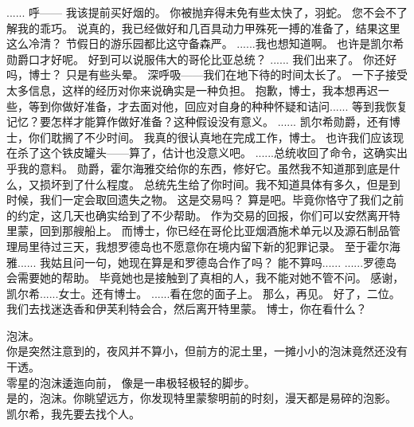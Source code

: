 \documentclass[openany]{book}
\begin{document}
\begin{dialogue}
     ......
     呼——
     我该提前买好烟的。
     你被抛弃得未免有些太快了，羽蛇。
     您不会不了解我的乖巧。
     说真的，我已经做好和几百具动力甲殊死一搏的准备了，结果这里这么冷清？
     节假日的游乐园都比这守备森严。
     ......我也想知道啊。
     也许是凯尔希勋爵口才好呢。
     好到可以说服伟大的哥伦比亚总统？
     ......
     我们出来了。
     你还好吗，博士？
     只是有些头晕。
     深呼吸——我们在地下待的时间太长了。
     一下子接受太多信息，这样的经历对你来说确实是一种负担。
     抱歉，博士，我本想再迟一些，等到你做好准备，才去面对他，回应对自身的种种怀疑和诘问......
     等到我恢复记忆？要怎样才能算作做好准备？这种假设没有意义。
     ......
     凯尔希勋爵，还有博士，你们耽搁了不少时间。
     我真的很认真地在完成工作，博士。
     也许我们应该现在杀了这个铁皮罐头——算了，估计也没意义吧。
     ......总统收回了命令，这确实出乎我的意料。
     勋爵，霍尔海雅交给你的东西，修好它。虽然我不知道那到底是什么，又损坏到了什么程度。
     总统先生给了你时间。我不知道具体有多久，但是到时候，我们一定会取回遗失之物。
     这是交易吗？
     算是吧。毕竟你恪守了我们之前的约定，这几天也确实给到了不少帮助。
     作为交易的回报，你们可以安然离开特里蒙，回到那艘船上。
     而博士，你已经在哥伦比亚烟酒施术单元以及源石制品管理局里待过三天，我想罗德岛也不愿意你在境内留下新的犯罪记录。
     至于霍尔海雅......
     我姑且问一句，她现在算是和罗德岛合作了吗？
     能不算吗......
     ......罗德岛会需要她的帮助。
     毕竟她也是接触到了真相的人，我不能对她不管不问。
     感谢，凯尔希......女士。还有博士。
     ......看在您的面子上。
     那么，再见。
     好了，二位。
     我们去找迷迭香和伊芙利特会合，然后离开特里蒙。
     博士，你在看什么？\par
    泡沫。\\
    你是突然注意到的，夜风并不算小，但前方的泥土里，一摊小小的泡沫竟然还没有干透。\\
    零星的泡沫逶迤向前， 像是一串极轻极轻的脚步。\\
    是的，泡沫。你眺望远方，你发现特里蒙黎明前的时刻，漫天都是易碎的泡影。
     凯尔希，我先要去找个人。
\end{dialogue}\par
\end{document}
